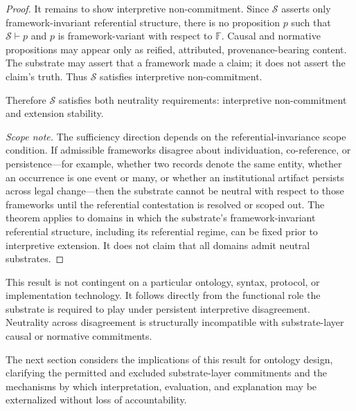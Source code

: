\begin{proof}
  It remains to show interpretive non-commitment.
  Since $\mathcal{S}$ asserts only framework-invariant referential structure,
  there is no proposition $p$ such that
  $\mathcal{S} \vdash p$
  and $p$ is framework-variant with respect to $\mathbb{F}$.
  Causal and normative propositions may appear only as
  reified, attributed, provenance-bearing content.
  The substrate may assert that a framework made a claim;
  it does not assert the claim's truth.
  Thus $\mathcal{S}$ satisfies interpretive non-commitment.

  Therefore $\mathcal{S}$ satisfies both neutrality requirements:
  interpretive non-commitment and extension stability.

  \medskip
  \noindent
  \textit{Scope note.}
  The sufficiency direction depends on the referential-invariance
  scope condition.
  If admissible frameworks disagree about individuation,
  co-reference, or persistence---for example,
  whether two records denote the same entity,
  whether an occurrence is one event or many,
  or whether an institutional artifact persists across legal change---then
  the substrate cannot be neutral with respect to those frameworks
  until the referential contestation is resolved or scoped out.
  The theorem applies to domains in which the substrate's
  framework-invariant referential structure,
  including its referential regime,
  can be fixed prior to interpretive extension.
  It does not claim that all domains admit neutral substrates.
\end{proof}

This result is not contingent on a particular ontology,
syntax, protocol, or implementation technology.
It follows directly from the functional role
the substrate is required to play under persistent interpretive disagreement.
Neutrality across disagreement is structurally incompatible
with substrate-layer causal or normative commitments.

The next section considers the implications of this result for ontology design,
clarifying the permitted and excluded substrate-layer commitments
and the mechanisms by which interpretation, evaluation,
and explanation may be externalized without loss of accountability.
